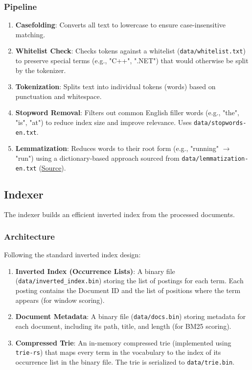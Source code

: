 \documentclass[11pt, a4paper]{article}
\begin{document}
\subsubsection*{Pipeline}
\begin{enumerate}
    \item \textbf{Casefolding}: Converts all text to lowercase to ensure case-insensitive matching.
    \item \textbf{Whitelist Check}: Checks tokens against a whitelist (\texttt{data/whitelist.txt}) to preserve special terms (e.g., "C++", ".NET") that would otherwise be split by the tokenizer.
    \item \textbf{Tokenization}: Splits text into individual tokens (words) based on punctuation and whitespace.
    \item \textbf{Stopword Removal}: Filters out common English filler words (e.g., "the", "is", "at") to reduce index size and improve relevance. Uses \texttt{data/stopwords-en.txt}.
    \item \textbf{Lemmatization}: Reduces words to their root form (e.g., "running" $\rightarrow$ "run") using a dictionary-based approach sourced from \texttt{data/lemmatization-en.txt} (\href{https://github.com/michmech/lemmatization-lists}{Source}).
\end{enumerate}

\subsection{Indexer}
The indexer builds an efficient inverted index from the processed documents.

\subsubsection*{Architecture}
Following the standard inverted index design:
\begin{enumerate}
    \item \textbf{Inverted Index (Occurrence Lists)}: A binary file (\texttt{data/inverted\_index.bin}) storing the list of postings for each term. Each posting contains the Document ID and the list of positions where the term appears (for window scoring).
    \item \textbf{Document Metadata}: A binary file (\texttt{data/docs.bin}) storing metadata for each document, including its path, title, and length (for BM25 scoring).
    \item \textbf{Compressed Trie}: An in-memory compressed trie (implemented using \texttt{trie-rs}) that maps every term in the vocabulary to the index of its occurrence list in the binary file. The trie is serialized to \texttt{data/trie.bin}.
\end{enumerate}
\end{document}

